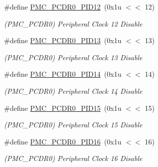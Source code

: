 \begin{DoxyCompactItemize}
\mbox{\label{group__SAMV71__PMC_gad2fcc7f49522909d0106d76a63d1b12f}} 
\#define \mbox{\hyperlink{group__SAMV71__PMC_gad2fcc7f49522909d0106d76a63d1b12f}{P\+M\+C\+\_\+\+P\+C\+D\+R0\+\_\+\+P\+I\+D12}}~(0x1u $<$$<$ 12)
\begin{DoxyCompactList}\small\item\em (P\+M\+C\+\_\+\+P\+C\+D\+R0) Peripheral Clock 12 Disable \end{DoxyCompactList}\item 
\mbox{\label{group__SAMV71__PMC_gac04c996cfaec7ab9e5518f4780882300}} 
\#define \mbox{\hyperlink{group__SAMV71__PMC_gac04c996cfaec7ab9e5518f4780882300}{P\+M\+C\+\_\+\+P\+C\+D\+R0\+\_\+\+P\+I\+D13}}~(0x1u $<$$<$ 13)
\begin{DoxyCompactList}\small\item\em (P\+M\+C\+\_\+\+P\+C\+D\+R0) Peripheral Clock 13 Disable \end{DoxyCompactList}\item 
\mbox{\label{group__SAMV71__PMC_ga30a0e016edb59302453ffd1fb0ce1960}} 
\#define \mbox{\hyperlink{group__SAMV71__PMC_ga30a0e016edb59302453ffd1fb0ce1960}{P\+M\+C\+\_\+\+P\+C\+D\+R0\+\_\+\+P\+I\+D14}}~(0x1u $<$$<$ 14)
\begin{DoxyCompactList}\small\item\em (P\+M\+C\+\_\+\+P\+C\+D\+R0) Peripheral Clock 14 Disable \end{DoxyCompactList}\item 
\mbox{\label{group__SAMV71__PMC_gae7739b10f4ea282433695fdcdcfefd2f}} 
\#define \mbox{\hyperlink{group__SAMV71__PMC_gae7739b10f4ea282433695fdcdcfefd2f}{P\+M\+C\+\_\+\+P\+C\+D\+R0\+\_\+\+P\+I\+D15}}~(0x1u $<$$<$ 15)
\begin{DoxyCompactList}\small\item\em (P\+M\+C\+\_\+\+P\+C\+D\+R0) Peripheral Clock 15 Disable \end{DoxyCompactList}\item 
\mbox{\label{group__SAMV71__PMC_ga1eed6205a0bc82ecfe67ebd13b87aef6}} 
\#define \mbox{\hyperlink{group__SAMV71__PMC_ga1eed6205a0bc82ecfe67ebd13b87aef6}{P\+M\+C\+\_\+\+P\+C\+D\+R0\+\_\+\+P\+I\+D16}}~(0x1u $<$$<$ 16)
\begin{DoxyCompactList}\small\item\em (P\+M\+C\+\_\+\+P\+C\+D\+R0) Peripheral Clock 16 Disable \end{DoxyCompactList}\item 
$$
\end{DoxyCompactItemize}
